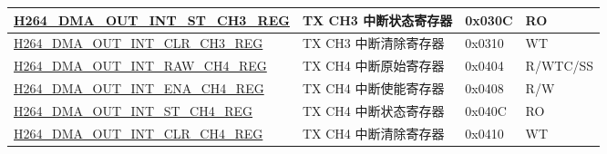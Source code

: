 \begin{longtable}{ | p{7.5cm} | p{5.7cm} | p{1.2cm} | p{1.5cm} | }
    \hyperref[regdesc:H264DMAOUTINTSTCH3REG]{H264\_DMA\_OUT\_INT\_ST\_CH3\_REG} & TX CH3 中断状态寄存器 & 0x030C & RO \\ \hline
    \hyperref[regdesc:H264DMAOUTINTCLRCH3REG]{H264\_DMA\_OUT\_INT\_CLR\_CH3\_REG} & TX CH3 中断清除寄存器 & 0x0310 & WT \\ \hline
    \hyperref[regdesc:H264DMAOUTINTRAWCH4REG]{H264\_DMA\_OUT\_INT\_RAW\_CH4\_REG} & TX CH4 中断原始寄存器 & 0x0404 & R/WTC/SS \\ \hline
    \hyperref[regdesc:H264DMAOUTINTENACH4REG]{H264\_DMA\_OUT\_INT\_ENA\_CH4\_REG} & TX CH4 中断使能寄存器 & 0x0408 & R/W \\ \hline
    \hyperref[regdesc:H264DMAOUTINTSTCH4REG]{H264\_DMA\_OUT\_INT\_ST\_CH4\_REG} & TX CH4 中断状态寄存器 & 0x040C & RO \\ \hline
    \hyperref[regdesc:H264DMAOUTINTCLRCH4REG]{H264\_DMA\_OUT\_INT\_CLR\_CH4\_REG} & TX CH4 中断清除寄存器 & 0x0410 & WT \\ \hline


\end{longtable}
